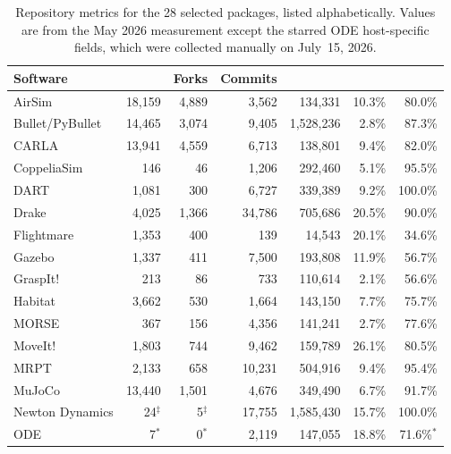 \begin{table}[p]
\centering
\caption{Repository metrics for the 28 selected packages, listed alphabetically. Values are from the May 2026 measurement except the starred ODE host-specific fields, which were collected manually on July~15, 2026.}
\label{tab:repository-metrics}
\small
\singlespacing
\setlength{\tabcolsep}{2pt}
\begin{tabular}{@{}p{2.2cm}rrrrrr@{}}
\toprule
\textbf{Software} &  & \textbf{Forks} & \textbf{Commits} &  &  &  \\
\midrule
AirSim & 18,159 & 4,889 & 3,562 & 134,331 & 10.3\% & 80.0\% \\
Bullet/\allowbreak{}PyBullet & 14,465 & 3,074 & 9,405 & 1,528,236 & 2.8\% & 87.3\% \\
CARLA & 13,941 & 4,559 & 6,713 & 138,801 & 9.4\% & 82.0\% \\
CoppeliaSim & 146 & 46 & 1,206 & 292,460 & 5.1\% & 95.5\% \\
DART & 1,081 & 300 & 6,727 & 339,389 & 9.2\% & 100.0\% \\
Drake & 4,025 & 1,366 & 34,786 & 705,686 & 20.5\% & 90.0\% \\
Flightmare & 1,353 & 400 & 139 & 14,543 & 20.1\% & 34.6\% \\
Gazebo & 1,337 & 411 & 7,500 & 193,808 & 11.9\% & 56.7\% \\
GraspIt! & 213 & 86 & 733 & 110,614 & 2.1\% & 56.6\% \\
Habitat & 3,662 & 530 & 1,664 & 143,150 & 7.7\% & 75.7\% \\
MORSE & 367 & 156 & 4,356 & 141,241 & 2.7\% & 77.6\% \\
MoveIt! & 1,803 & 744 & 9,462 & 159,789 & 26.1\% & 80.5\% \\
MRPT & 2,133 & 658 & 10,231 & 504,916 & 9.4\% & 95.4\% \\
MuJoCo & 13,440 & 1,501 & 4,676 & 349,490 & 6.7\% & 91.7\% \\
Newton Dynamics & 24$^\ddagger$ & 5$^\ddagger$ & 17,755 & 1,585,430 & 15.7\% & 100.0\% \\
ODE & 7$^*$ & 0$^*$ & 2,119 & 147,055 & 18.8\% & 71.6\%$^*$ \\

\end{tabular}
\end{table}
